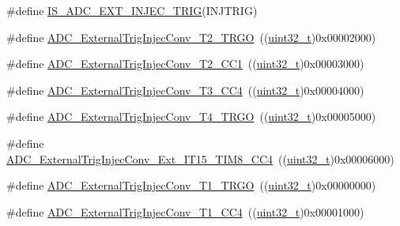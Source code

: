 \begin{DoxyCompactItemize}
\item 
\#define \hyperlink{group___a_d_c__external__trigger__sources__for__injected__channels__conversion_ga3cb8cadbff46e432b5e000c3a7489a0b}{I\+S\+\_\+\+A\+D\+C\+\_\+\+E\+X\+T\+\_\+\+I\+N\+J\+E\+C\+\_\+\+T\+R\+IG}(I\+N\+J\+T\+R\+IG)
\item 
\#define \hyperlink{group___a_d_c__external__trigger__sources__for__injected__channels__conversion_gaaad112b2b035dfd77c9743197c51b16f}{A\+D\+C\+\_\+\+External\+Trig\+Injec\+Conv\+\_\+\+T2\+\_\+\+T\+R\+GO}~((\hyperlink{_p_e___types_8h_a33594304e786b158f3fb30289278f5af}{uint32\+\_\+t})0x00002000)
\item 
\#define \hyperlink{group___a_d_c__external__trigger__sources__for__injected__channels__conversion_ga49089501c5bf2a2c22019fbca4b688e9}{A\+D\+C\+\_\+\+External\+Trig\+Injec\+Conv\+\_\+\+T2\+\_\+\+C\+C1}~((\hyperlink{_p_e___types_8h_a33594304e786b158f3fb30289278f5af}{uint32\+\_\+t})0x00003000)
\item 
\#define \hyperlink{group___a_d_c__external__trigger__sources__for__injected__channels__conversion_ga6c9ddf9bba0cefe77dbcd601aed24f7b}{A\+D\+C\+\_\+\+External\+Trig\+Injec\+Conv\+\_\+\+T3\+\_\+\+C\+C4}~((\hyperlink{_p_e___types_8h_a33594304e786b158f3fb30289278f5af}{uint32\+\_\+t})0x00004000)
\item 
\#define \hyperlink{group___a_d_c__external__trigger__sources__for__injected__channels__conversion_gab12e5503085cdb9dde4a59614e421284}{A\+D\+C\+\_\+\+External\+Trig\+Injec\+Conv\+\_\+\+T4\+\_\+\+T\+R\+GO}~((\hyperlink{_p_e___types_8h_a33594304e786b158f3fb30289278f5af}{uint32\+\_\+t})0x00005000)
\item 
\#define \hyperlink{group___a_d_c__external__trigger__sources__for__injected__channels__conversion_gaa23965b742e08142e5d1c453166dbcc2}{A\+D\+C\+\_\+\+External\+Trig\+Injec\+Conv\+\_\+\+Ext\+\_\+\+I\+T15\+\_\+\+T\+I\+M8\+\_\+\+C\+C4}~((\hyperlink{_p_e___types_8h_a33594304e786b158f3fb30289278f5af}{uint32\+\_\+t})0x00006000)
\item 
\#define \hyperlink{group___a_d_c__external__trigger__sources__for__injected__channels__conversion_gabf47f66e60c166f6b63b805f72ad94b0}{A\+D\+C\+\_\+\+External\+Trig\+Injec\+Conv\+\_\+\+T1\+\_\+\+T\+R\+GO}~((\hyperlink{_p_e___types_8h_a33594304e786b158f3fb30289278f5af}{uint32\+\_\+t})0x00000000)
\item 
\#define \hyperlink{group___a_d_c__external__trigger__sources__for__injected__channels__conversion_gabd27bcc6ff5af6713a124b3801759bcf}{A\+D\+C\+\_\+\+External\+Trig\+Injec\+Conv\+\_\+\+T1\+\_\+\+C\+C4}~((\hyperlink{_p_e___types_8h_a33594304e786b158f3fb30289278f5af}{uint32\+\_\+t})0x00001000)

\end{DoxyCompactItemize}
